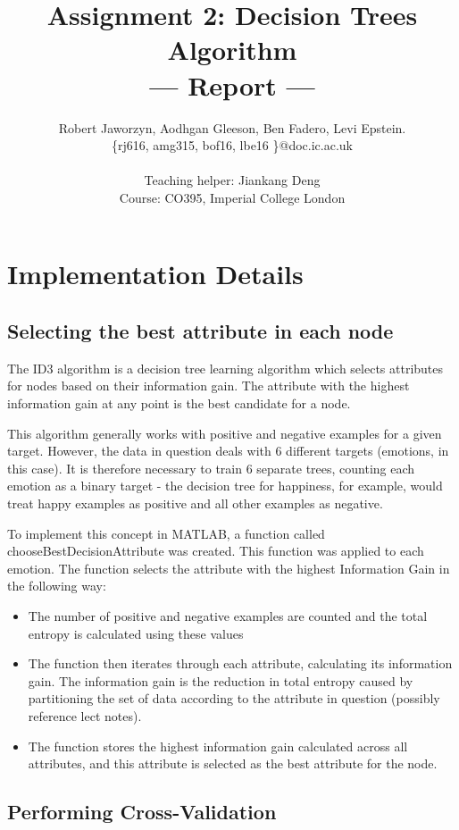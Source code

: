 \documentclass[a4paper,11pt]{article}
\title{Assignment 2: Decision Trees Algorithm\\\Large{--- Report ---}}
\author{Robert Jaworzyn, Aodhgan Gleeson, Ben Fadero, Levi Epstein.\\
       \{rj616, amg315, bof16, lbe16 \}@doc.ic.ac.uk\\ \\
       \small{Teaching helper: Jiankang Deng}\\
       \small{Course: CO395, Imperial College London}
}
\begin{document}
\maketitle

\section{Implementation Details}

\subsection{Selecting the best attribute in each node}
 
The ID3 algorithm is a decision tree learning algorithm which selects attributes for nodes based on their information gain. The attribute with the highest information gain at any point is the best candidate for a node.

This algorithm generally works with positive and negative examples for a given target. However, the data in question deals with 6 different targets (emotions, in this case). It is therefore necessary to train 6 separate trees, counting each emotion as a binary target - the decision tree for happiness, for example, would treat happy examples as positive and all other examples as negative. 

To implement this concept in MATLAB, a function called chooseBestDecisionAttribute was created. This function was applied to each emotion. The function selects the attribute with the highest Information Gain in the following way:

\begin{itemize}
	\item The number of positive and negative examples are counted and the total entropy is calculated using these values
	\item The function then iterates through each attribute, calculating its information gain. The information gain is the reduction in total entropy caused by partitioning the set of data according to the attribute in question (possibly reference lect notes).  
	\item The function stores the highest information gain calculated across all attributes, and this attribute is selected as the best attribute for the node.
\end{itemize}
\subsection{Performing Cross-Validation} \label{cross}
\end{document}
